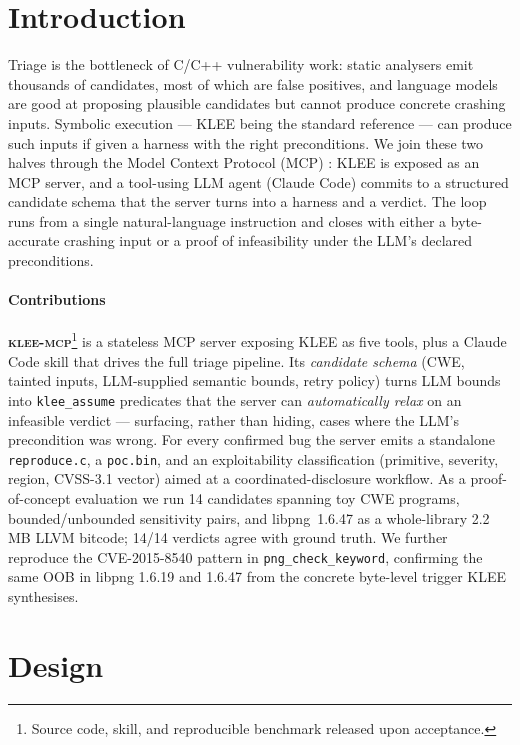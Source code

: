 \documentclass[3p,times,procedia]{elsarticle}
\begin{document}
\section{Introduction}
\label{sec:intro}

Triage is the bottleneck of C/C++ vulnerability work: static analysers emit thousands of candidates, most of which are false positives, and language models are good at proposing plausible candidates but cannot produce concrete crashing inputs. Symbolic execution --- KLEE \cite{klee} being the standard reference --- can produce such inputs if given a harness with the right preconditions. We join these two halves through the Model Context Protocol (MCP) \cite{mcp}: KLEE is exposed as an MCP server, and a tool-using LLM agent (Claude Code) commits to a structured candidate schema that the server turns into a harness and a verdict. The loop runs from a single natural-language instruction and closes with either a byte-accurate crashing input or a proof of infeasibility under the LLM's declared preconditions.

\paragraph{Contributions} \textbf{\textsc{klee-mcp}}\footnote{Source code, skill, and reproducible benchmark released upon acceptance.} is a stateless MCP server exposing KLEE as five tools, plus a Claude Code skill that drives the full triage pipeline. Its \emph{candidate schema} (CWE, tainted inputs, LLM-supplied semantic bounds, retry policy) turns LLM bounds into \texttt{klee\_assume} predicates that the server can \emph{automatically relax} on an infeasible verdict --- surfacing, rather than hiding, cases where the LLM's precondition was wrong. For every confirmed bug the server emits a standalone \texttt{reproduce.c}, a \texttt{poc.bin}, and an exploitability classification (primitive, severity, region, CVSS-3.1 vector) aimed at a coordinated-disclosure workflow. As a proof-of-concept evaluation we run 14 candidates spanning toy CWE programs, bounded/unbounded sensitivity pairs, and libpng~1.6.47 as a whole-library 2.2\,MB LLVM bitcode; 14/14 verdicts agree with ground truth. We further reproduce the CVE-2015-8540 pattern in \texttt{png\_check\_keyword}, confirming the same OOB in libpng 1.6.19 and 1.6.47 from the concrete byte-level trigger KLEE synthesises.

\section{Design}
\label{sec:design}
\end{document}
